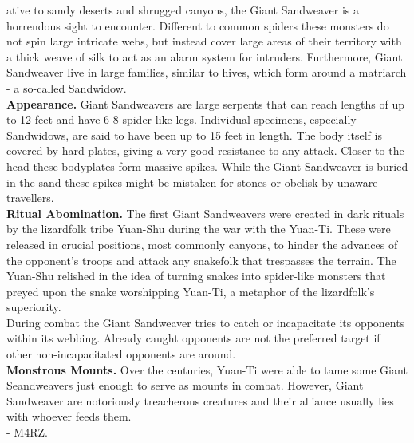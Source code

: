 \documentclass[a4paper,openany,twoside,twocolumn]{book}
\begin{document}

\MonsterSheetGeometry

\mainmatter%


\entryfont \noindent {}ative to sandy deserts and shrugged canyons, the Giant Sandweaver is a horrendous sight to encounter. Different to common spiders these monsters do not spin large intricate webs, but instead cover large areas of their territory with a thick weave of silk to act as an alarm system for intruders. Furthermore, Giant Sandweaver live in large families, similar to hives, which form around a matriarch - a so-called Sandwidow.\\
\textbf{Appearance.} Giant Sandweavers are large serpents that can reach lengths of up to 12 feet and have 6-8 spider-like legs. Individual specimens, especially Sandwidows, are said to have been up to 15 feet in length. The body itself is covered by hard plates, giving a very good resistance to any attack. Closer to the head these bodyplates form massive spikes. While the Giant Sandweaver is buried in the sand these spikes might be mistaken for stones or obelisk by unaware travellers.\\
\textbf{Ritual Abomination.} The first Giant Sandweavers were created in dark rituals by the lizardfolk tribe Yuan-Shu during the war with the Yuan-Ti. These were released in crucial positions, most commonly canyons, to hinder the advances of the opponent's troops and attack any snakefolk that trespasses the terrain. The Yuan-Shu relished in the idea of turning snakes into spider-like monsters that preyed upon the snake worshipping Yuan-Ti, a metaphor of the lizardfolk's superiority.\\
During combat the Giant Sandweaver tries to catch or incapacitate its opponents within its webbing. Already caught opponents are not the preferred target if other non-incapacitated opponents are around.\\
\textbf{Monstrous Mounts.} Over the centuries, Yuan-Ti were able to tame some Giant Seandweavers just enough to serve as mounts in combat. However, Giant Sandweaver are notoriously treacherous creatures and their alliance usually lies with whoever feeds them.\\
- M4RZ.\\
\end{document}
